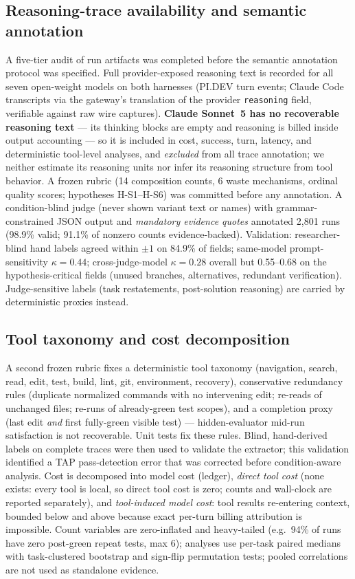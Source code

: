 \documentclass[11pt]{article}
\newcommand{\pidev}{PI.DEV}
\newcommand{\cc}{Claude Code}
\begin{document}
\subsection{Reasoning-trace availability and semantic annotation}
A five-tier audit of run artifacts was completed before the semantic
annotation protocol was specified. Full
provider-exposed reasoning text is recorded for all seven open-weight
models on both harnesses (\pidev{} turn events; \cc{} transcripts via the
gateway's translation of the provider \texttt{reasoning} field, verifiable
against raw wire captures). \textbf{Claude Sonnet~5 has no recoverable
reasoning text} --- its thinking blocks are empty and reasoning is billed
inside output accounting --- so it is included in cost, success, turn,
latency, and deterministic tool-level analyses, and \emph{excluded} from
all trace annotation; we neither estimate its reasoning units nor infer
its reasoning structure from tool behavior. A frozen rubric (14
composition counts, 6 waste mechanisms, ordinal quality scores; hypotheses
H-S1--H-S6) was committed before any annotation. A condition-blind judge
(never shown variant text or names) with grammar-constrained JSON output
and \emph{mandatory evidence quotes} annotated 2{,}801 runs (98.9\% valid;
91.1\% of nonzero counts evidence-backed). Validation: researcher-blind
hand labels agreed within $\pm1$ on 84.9\% of fields; same-model
prompt-sensitivity $\kappa=0.44$; cross-judge-model $\kappa=0.28$ overall
but 0.55--0.68 on the hypothesis-critical fields (unused branches,
alternatives, redundant verification). Judge-sensitive labels
(task restatements, post-solution reasoning) are carried by deterministic
proxies instead.

\subsection{Tool taxonomy and cost decomposition}
A second frozen rubric fixes a deterministic tool taxonomy (navigation,
search, read, edit, test, build, lint, git, environment, recovery),
conservative redundancy rules (duplicate normalized commands with no
intervening edit; re-reads of unchanged files; re-runs of already-green
test scopes), and a completion proxy (last edit \emph{and} first
fully-green visible test) --- hidden-evaluator mid-run satisfaction is not
recoverable. Unit tests fix these rules. Blind, hand-derived labels on complete traces
were then used to validate the extractor; this validation identified a TAP
pass-detection error that was corrected before condition-aware analysis. Cost is
decomposed into model cost (ledger), \emph{direct tool cost} (none exists:
every tool is local, so direct tool cost is zero; counts and wall-clock are
reported separately), and \emph{tool-induced model cost}: tool results
re-entering context, bounded below and above because exact per-turn
billing attribution is impossible. Count variables are zero-inflated and
heavy-tailed (e.g.\ 94\% of runs have zero post-green repeat tests, max
6); analyses use per-task paired medians with task-clustered bootstrap and
sign-flip permutation tests; pooled correlations are not used as standalone
evidence.
\end{document}

